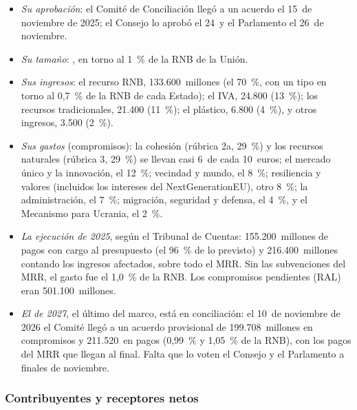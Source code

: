 \documentclass[11pt]{article}
\begin{document}
\begin{itemize}
\item \emph{Su aprobación}: el Comité de Conciliación llegó a un acuerdo el 15~de noviembre de 2025; el Consejo lo aprobó el 24~y el Parlamento el 26~de noviembre\nocite{PE2025Presupuesto2026}.
\item \emph{Su tamaño}: , en torno al 1~\% de la RNB de la Unión.
\item \emph{Sus ingresos}: el recurso RNB, 133.600~millones (el 70~\%, con un tipo en torno al 0,7~\% de la RNB de cada Estado); el IVA, 24.800 (13~\%); los recursos tradicionales, 21.400 (11~\%); el plástico, 6.800 (4~\%), y otros ingresos, 3.500 (2~\%)\nocite{UE2026Presupuesto2026}.
\item \emph{Sus gastos} (compromisos): la cohesión (rúbrica 2a, 29~\%) y los recursos naturales (rúbrica 3, 29~\%) se llevan casi 6~de cada 10~euros; el mercado único y la innovación, el 12~\%; vecindad y mundo, el 8~\%; resiliencia y valores (incluidos los intereses del NextGenerationEU), otro 8~\%; la administración, el 7~\%; migración, seguridad y defensa, el 4~\%, y el Mecanismo para Ucrania, el 2~\%.
\item \emph{La ejecución de 2025}, según el Tribunal de Cuentas: 155.200~millones de pagos con cargo al presupuesto (el 96~\% de lo previsto) y 216.400~millones contando los ingresos afectados, sobre todo el MRR. Sin las subvenciones del MRR, el gasto fue el 1,0~\% de la RNB. Los compromisos pendientes (RAL) eran 501.100~millones\nocite{TCE2026InformeAnual}.
\item \emph{El de 2027}, el último del marco, está en conciliación: el 10~de noviembre de 2026 el Comité llegó a un acuerdo provisional de 199.708~millones en compromisos y 211.520~en pagos (0,99~\% y 1,05~\% de la RNB), con los pagos del MRR que llegan al final. Falta que lo voten el Consejo y el Parlamento a finales de noviembre\nocite{CE2026Presupuesto2027}.
\end{itemize}

\subsubsection{Contribuyentes y receptores netos}\label{sec:saldos}
\end{document}
